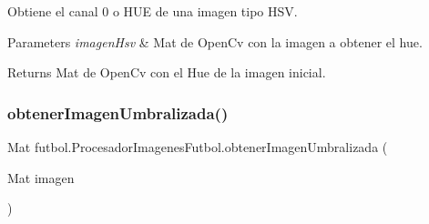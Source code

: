 Obtiene el canal 0 o H\+UE de una imagen tipo H\+SV. 
\begin{DoxyParams}{Parameters}
{\em imagen\+Hsv} & Mat de Open\+Cv con la imagen a obtener el hue. \\
\hline
\end{DoxyParams}
\begin{DoxyReturn}{Returns}
Mat de Open\+Cv con el Hue de la imagen inicial. 
\end{DoxyReturn}
\hypertarget{classfutbol_1_1_procesador_imagenes_futbol_abc746fc064bec1c20d6676dac4677537}{}\label{classfutbol_1_1_procesador_imagenes_futbol_abc746fc064bec1c20d6676dac4677537} 
\subsubsection{\texorpdfstring{obtener\+Imagen\+Umbralizada()}{obtenerImagenUmbralizada()}}
{\footnotesize\ttfamily Mat futbol.\+Procesador\+Imagenes\+Futbol.\+obtener\+Imagen\+Umbralizada (\begin{DoxyParamCaption}\item[{Mat}]{imagen }\end{DoxyParamCaption})\hspace{0.3cm}{\ttfamily [private]}}

